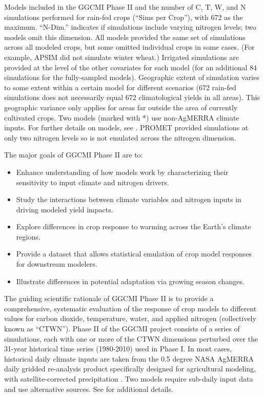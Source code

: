 \documentclass[preprint, 5p, times, twocolumn]{elsarticle}
\begin{document}
\begin{table}[!t]
 \caption{Models included in the GGCMI Phase II and the number of C, T, W, and N simulations performed for rain-fed crops (``Sims per Crop''), with 672 as the maximum. ``N-Dim.'' indicates if simulations include varying nitrogen levels; two models omit this dimension. All models provided the same set of simulations across all modeled crops, but some omitted individual crops in some cases. (For example, APSIM did not simulate winter wheat.) Irrigated simulations are provided at the level of the other covariates for each model (for an additional 84 simulations for the fully-sampled models). Geographic extent of simulation varies to some extent within a certain model for different scenarios (672 rain-fed simulations does not necessarily equal 672 climatological yields in all areas). This geographic variance only applies for areas far outside the area of currently cultivated crops. Two models (marked with *) use non-AgMERRA climate inputs. For further details on models, see \citet{Elliott2015}. \dag PROMET provided simulations at only two nitrogen levels so is not emulated across the nitrogen dimension.} 
\label{table:models}
\end{table}

The major goals of GGCMI Phase II are to:
\begin{itemize}
  \setlength\itemsep{0.3mm}
    \item Enhance understanding of how models work by characterizing their sensitivity to input climate and nitrogen drivers.
    \item Study the interactions between climate variables and nitrogen inputs in driving modeled yield impacts. 
    \item Explore differences in crop response to warming across the Earth's climate regions.
    \item Provide a dataset that allows statistical emulation of crop model responses for downstream modelers.
    \item Illustrate differences in potential adaptation via growing season changes. 
\end{itemize}

The guiding scientific rationale of GGCMI Phase II is to provide a comprehensive, systematic evaluation of the response of crop models to different values for carbon dioxide, temperature, water, and applied nitrogen (collectively known as ``CTWN''). Phase II of the GGCMI project consists of a series of simulations, each with one or more of the CTWN dimensions perturbed over the 31-year historical time series (1980-2010) used in Phase I. In most cases, historical daily climate inputs are taken from the 0.5 degree NASA AgMERRA daily gridded re-analysis product specifically designed for agricultural modeling, with satellite-corrected precipitation \citep{Ruane2015}. Two models require sub-daily input data and use alternative sources. See \citet{Elliott2015} for additional details. 
\end{document}
